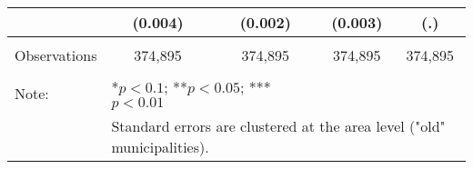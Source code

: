 \begin{table}[H]
\begin{tabular}{@{}lcccc@{}}
  & (0.004) & (0.002) & (0.003) & (.)\\
  \midrule
  \multicolumn{5}{l}{}                                                          \\
  Observations & 374,895 & 374,895 & 374,895 & 374,895 \\
  \multicolumn{5}{l}{}                                                          \\ \midrule
  Note:                  & \multicolumn{2}{l}{*$p<0.1$; **$p<0.05$; ***$p<0.01$}      \\
   & \multicolumn{4}{l}{Standard errors are clustered at the area level ("old" municipalities).}
  \end{tabular}
  \end{table}